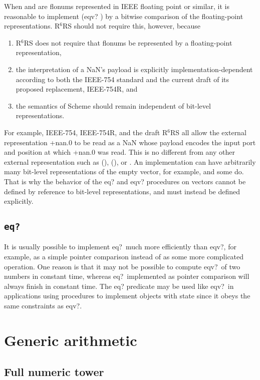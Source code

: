 \documentclass[twoside,twocolumn]{algol60}
\newcommand{\rn}[1]{R$^{#1}$RS}
\begin{document}
When  and  are flonums represented in IEEE floating
point or similar, it is reasonable to implement {\cf (eqv? 
  )} by a bitwise comparison of the floating-point
representations.  \rn{6} should not require this, however, because
%
\begin{enumerate}
\item \rn{6} does not require that flonums be represented by a
  floating-point representation,
\item the interpretation of a NaN's payload is explicitly
  implementation-dependent according to both the IEEE-754 standard and
  the current draft of its proposed replacement, IEEE-754R, and
\item the semantics of Scheme should remain independent
  of bit-level representations.
\end{enumerate}
%
For example, IEEE-754, IEEE-754R, and the draft \rn{6} all allow the
external representation {\cf +nan.0} to be read as a NaN whose payload
encodes the input port and position at which {\cf +nan.0} was read.
This is no different from any other external representation such as
{\cf ()}, {\cf \sharpsign()}, or {}.  An implementation can
have arbitrarily many bit-level representations of the empty vector,
for example, and some do.  That is why the behavior of the {\cf eq?}
and {\cf eqv?} procedures on vectors cannot be defined by reference to
bit-level representations, and must instead be defined explicitly.

\subsection{{\tt eq?}}

It is usually possible to implement {\cf eq?}\ much more efficiently
than {\cf eqv?}, for example, as a simple pointer comparison instead
of as some more complicated operation.  One reason is that it may not
be possible to compute {\cf eqv?}\ of two numbers in constant time,
whereas {\cf eq?}\ implemented as pointer comparison will always
finish in constant time.  The {\cf eq?} predicate may be used like
{\cf eqv?}\ in applications using procedures to implement objects with
state since it obeys the same constraints as {\cf eqv?}.

\section{Generic arithmetic}

\subsection{Full numeric tower}
\end{document}
